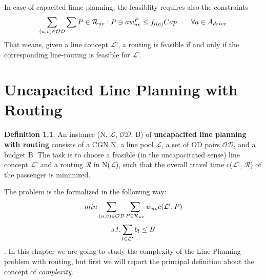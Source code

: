 \documentclass[
  twoside,
  11pt, a4paper,
  footinclude=true,
  headinclude=true,
  cleardoublepage=empty
]{scrbook}
\theoremstyle{definition}
\newtheorem{definition}[theorem]{Definition}
\begin{document}
In case of capacited linne planning, the feasiblity requires also the constraints
\begin{equation} \notag
\sum_{(u,v)\in\mathcal{OD}} \sum{P\in\mathcal{R}_{uv}:P\ni a} w^{P}_{uv} \le f_{l(a)}Cap \quad \quad \forall a \in A_{drive}
\end{equation}
That means, given a line concept $\mathcal{L}$', a routing is feasible if and only if the corresponding line-routing is feasible for $\mathcal{L}$'.



\chapter{Uncapacited Line Planning with Routing}
\begin{definition} An instance (N, $\mathcal{L}$, $\mathcal{OD}$, B) of \textbf{uncapacited line planning with routing} consists of a CGN N, a line pool $\mathcal{L}$, a set of OD pairs $\mathcal{OD}$, and a budget B. \newline
The task is to choose a feasible (in the uncapacitated sense) line concept $\mathcal{L}$' and a routing $\mathcal{R}$ in N($\mathcal{L}$), such that the overall travel time c($\mathcal{L}$', $\mathcal{R}$) of the passenger is minimized.
\end{definition}
The problem is the formalized in the following way:
\begin{equation} \notag
min \sum_{(u, v) \in \mathcal{OD}} \sum_{P \in \mathcal{R}_{uv}} w_{uv}c(\mathcal{L}', P)
\end{equation}
\begin{equation} \notag
s.t. \sum_{l \in \mathcal{L}'} b_l \le B
\end{equation}. 
In this chapter we are going to study the complexity of the Line Planning problem with routing, but first we will report the principal definition about the concept of \emph{complexity}.
\end{document}
